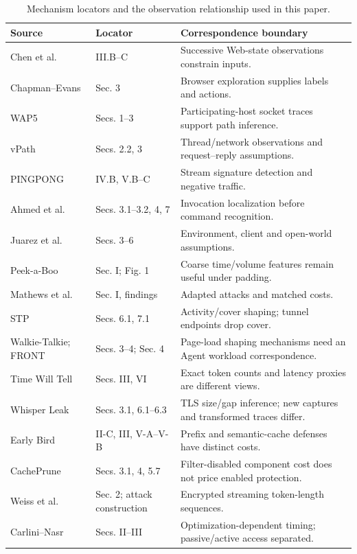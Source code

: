 \begin{table}[t]\centering\small
\caption{Mechanism locators and the observation relationship used in this paper.}
\label{tab:mature-locators}
\begin{tabularx}{\textwidth}{@{}P{.27\textwidth}P{.22\textwidth}Y@{}}\toprule
Source & Locator & Correspondence boundary \\\midrule
Chen et al.~\cite{chen2010web} & III.B--C & Successive Web-state observations constrain inputs. \\
Chapman--Evans~\cite{chapman2011blackbox} & Sec. 3 & Browser exploration supplies labels and actions. \\
WAP5~\cite{reynolds2006wap5} & Secs. 1--3 & Participating-host socket traces support path inference. \\
vPath~\cite{tak2009vpath} & Secs. 2.2, 3 & Thread/network observations and request--reply assumptions. \\
PINGPONG~\cite{trimananda2020pingpong} & IV.B, V.B--C & Stream signature detection and negative traffic. \\
Ahmed et al.~\cite{ahmed2023voice} & Secs. 3.1--3.2, 4, 7 & Invocation localization before command recognition. \\
Juarez et al.~\cite{juarez2014critical} & Secs. 3--6 & Environment, client and open-world assumptions. \\
Peek-a-Boo~\cite{dyer2012peekaboo} & Sec. I; Fig. 1 & Coarse time/volume features remain useful under padding. \\
Mathews et al.~\cite{mathews2023critical} & Sec. I, findings & Adapted attacks and matched costs. \\
STP~\cite{apthorpe2019stp} & Secs. 6.1, 7.1 & Activity/cover shaping; tunnel endpoints drop cover. \\
Walkie-Talkie; FRONT~\cite{wang2017walkietalkie,gong2020front} & Secs. 3--4; Sec. 4 & Page-load shaping mechanisms need an Agent workload correspondence. \\
Time Will Tell~\cite{timewilltell2024} & Secs. III, VI & Exact token counts and latency proxies are different views. \\
Whisper Leak~\cite{whisperleak2025} & Secs. 3.1, 6.1--6.3 & TLS size/gap inference; new captures and transformed traces differ. \\
Early Bird~\cite{earlybird2025} & II-C, III, V-A--V-B & Prefix and semantic-cache defenses have distinct costs. \\
CachePrune~\cite{wu2026cacheprune} & Secs. 3.1, 4, 5.7 & Filter-disabled component cost does not price enabled protection. \\
Weiss et al.~\cite{weiss2024prompt} & Sec. 2; attack construction & Encrypted streaming token-length sequences. \\
Carlini--Nasr~\cite{carlini2024timing} & Secs. II--III & Optimization-dependent timing; passive/active access separated. \\\bottomrule
\end{tabularx}\end{table}

